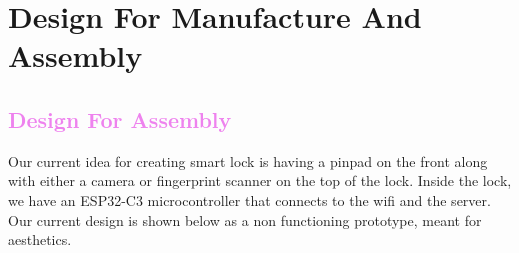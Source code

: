 \section{Design For Manufacture And Assembly}

\textcolor{violet}{\subsection{Design For Assembly}}

Our current idea for creating smart lock is having a pinpad on the front along with either a camera or fingerprint scanner on the top of the lock. Inside the lock, we have an ESP32-C3 microcontroller that connects to the wifi and the server. Our current design is shown below as a non functioning prototype, meant for aesthetics.

